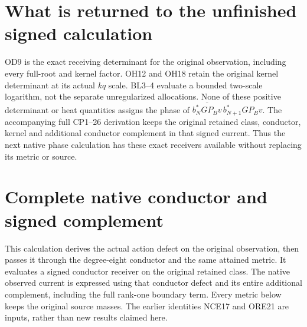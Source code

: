 \documentclass[11pt]{article}
\begin{document}
\section{What is returned to the unfinished signed calculation}
OD9 is the exact receiving determinant for the original observation,
including every full-root and kernel factor. OH12 and OH18 retain the
original kernel determinant at its actual $kq$ scale. BL3--4 evaluate
a bounded two-scale logarithm, not the separate unregularized
allocations. None of these positive determinant or heat quantities
assigns the phase of $\overline{b_N^*GP_Bv}\,b_{N+1}^*GP_Bv$.
The accompanying full CP1--26 derivation keeps the original retained
class, conductor, kernel and additional conductor complement in that
signed current. Thus the next native phase calculation has these
exact receivers available without replacing its metric or source.


\appendix
\clearpage
\section*{Complete native conductor and signed complement}

This calculation derives the actual action defect on the original observation,
then passes it through the degree-eight conductor and the same attained metric.
It evaluates a signed conductor receiver on the original retained class.
The native observed current is expressed using that conductor defect and its
entire additional complement, including the full rank-one boundary term.
Every metric below keeps the original source masses. The earlier identities
NCE17 and ORE21 are inputs, rather than new results claimed here.
\end{document}
